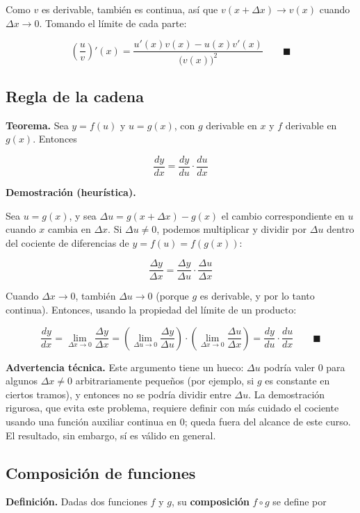 \documentclass[12pt,tikz,border=5pt]{article}
\begin{document}
Como $v$ es derivable, también es continua, así que $v(x+\Delta x)\to v(x)$
cuando $\Delta x\to 0$. Tomando el límite de cada parte:

$$\left(\frac{u}{v}\right)'(x) = \frac{u'(x)v(x) - u(x)v'(x)}{\big(v(x)\big)^2} \qquad \blacksquare$$

\subsection{Regla de la cadena}

\textbf{Teorema.} Sea $y=f(u)$ y $u=g(x)$, con $g$ derivable en $x$ y $f$
derivable en $g(x)$. Entonces

$$\frac{dy}{dx} = \frac{dy}{du}\cdot\frac{du}{dx}$$

\textbf{Demostración (heurística).}

Sea $u=g(x)$, y sea $\Delta u = g(x+\Delta x)-g(x)$ el cambio
correspondiente en $u$ cuando $x$ cambia en $\Delta x$. Si $\Delta u\ne 0$,
podemos multiplicar y dividir por $\Delta u$ dentro del cociente de
diferencias de $y=f(u)=f(g(x))$:

$$\frac{\Delta y}{\Delta x} = \frac{\Delta y}{\Delta u}\cdot\frac{\Delta u}{\Delta x}$$

Cuando $\Delta x\to 0$, también $\Delta u\to 0$ (porque $g$ es derivable, y
por lo tanto continua). Entonces, usando la propiedad del límite de un
producto:

$$\frac{dy}{dx} = \lim_{\Delta x\to 0}\frac{\Delta y}{\Delta x} = \left(\lim_{\Delta u\to 0}\frac{\Delta y}{\Delta u}\right)\cdot\left(\lim_{\Delta x\to 0}\frac{\Delta u}{\Delta x}\right) = \frac{dy}{du}\cdot\frac{du}{dx} \qquad \blacksquare$$

\textbf{Advertencia técnica.} Este argumento tiene un hueco: $\Delta u$
podría valer $0$ para algunos $\Delta x\ne 0$ arbitrariamente pequeños (por
ejemplo, si $g$ es constante en ciertos tramos), y entonces no se podría
dividir entre $\Delta u$. La demostración rigurosa, que evita este
problema, requiere definir con más cuidado el cociente usando una función
auxiliar continua en $0$; queda fuera del alcance de este curso. El
resultado, sin embargo, sí es válido en general.

\subsection{Composición de funciones}

\textbf{Definición.} Dadas dos funciones $f$ y $g$, su \textbf{composición}
$f\circ g$ se define por
\end{document}
